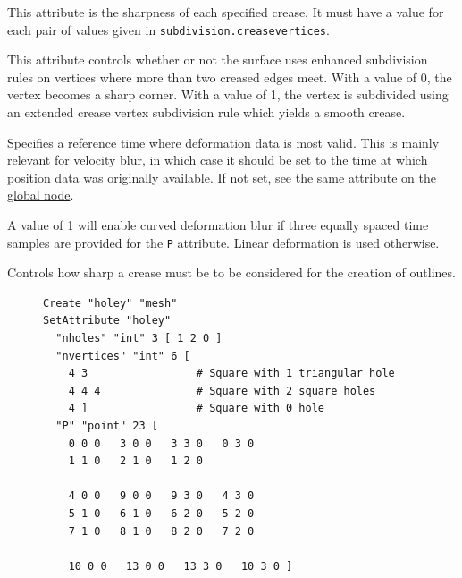 \documentclass[oneside,ebook]{memoir}
\newcommand{\paramlistitemTN}[2]{\item[#2\textcolor{lightgray}{\dotfill}#1]}
\newcommand{\paramlistitemTND}[3]{\paramlistitemTN{#1 {\rmfamily({\ttfamily#3})}}{#2}}
\begin{document}
\begin{paramlist}
This attribute is the sharpness of each specified crease.
It must have a value for each pair of values given in \lstinline|subdivision.creasevertices|.
\paramlistitemTND{int}{subdivision.smoothcreasecorners}{1}
This attribute controls whether or not the surface uses enhanced subdivision rules on vertices where more than two creased edges meet. With a value of 0, the vertex becomes a sharp corner. With a value of 1, the vertex is subdivided using an extended crease vertex subdivision rule which yields a smooth crease.
\paramlistitemTN{double}{referencetime}
Specifies a reference time where deformation data is most valid.
This is mainly relevant for velocity blur, in which case it should be set to the time at which position data was originally available.
If not set, see the same attribute on the \hyperref[section:globalnode]{global node}.
\paramlistitemTND{int}{quadraticmotion}{0}
A value of 1 will enable curved deformation blur if three equally spaced time samples are provided for the \lstinline|P| attribute. Linear deformation is used otherwise.
\paramlistitemTND{float}{outlinecreasethreshold}{10}
Controls how sharp a crease must be to be considered for the creation of outlines.
\end{paramlist}

\begin{figure}
\centering
\footnotesize
\begin{lstlisting}[caption={Definition of a polygon mesh with holes},label={fig:holey_mesh}, frame=top, frame=bottom]
Create "holey" "mesh"
SetAttribute "holey"
  "nholes" "int" 3 [ 1 2 0 ]
  "nvertices" "int" 6 [
    4 3                 # Square with 1 triangular hole
    4 4 4               # Square with 2 square holes
    4 ]                 # Square with 0 hole
  "P" "point" 23 [
    0 0 0   3 0 0   3 3 0   0 3 0
    1 1 0   2 1 0   1 2 0

    4 0 0   9 0 0   9 3 0   4 3 0
    5 1 0   6 1 0   6 2 0   5 2 0
    7 1 0   8 1 0   8 2 0   7 2 0

    10 0 0   13 0 0   13 3 0   10 3 0 ]
\end{lstlisting}
\end{figure}
\end{document}
